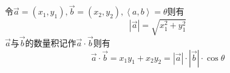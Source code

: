 令$\overrightarrow a  = \left( {{x_1},{y_1}} \right),\overrightarrow b  = \left( {{x_2},{y_2}} \right),\left\langle {a,b} \right\rangle  = \theta $则有
\begin{equation}
\left| {\overrightarrow a } \right| = \sqrt {x_1^2 + y_1^2}
\end{equation}
$\overrightarrow a$与$\overrightarrow b$的数量积记作$\overrightarrow a  \cdot \overrightarrow b $则有
\begin{equation}
\overrightarrow a  \cdot \overrightarrow b  = {x_1}{y_1} + {x_2}{y_2} = \left| {\overrightarrow a } \right| \cdot \left| {\overrightarrow b } \right| \cdot \cos \theta 
\end{equation}